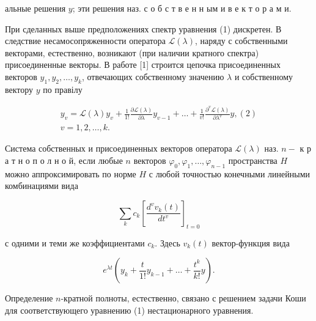 \documentclass[10pt]{article}
\begin{document}
альные решения $y$; эти решения наз. с о б с т в е н н ым и в е к т о р а м и.



При сделанных выше предположениях спектр уравнения (1) дискретен. В следствие несамосопряженности оператора $\mathscr{L}(\lambda)$, наряду с собственными векторами, естественно, возникают (при наличии кратного спектра) присоединенные векторы. В работе [1] строится цепочка присоединенных векторов $y_{1}, y_{2}, \ldots, y_{k}$, отвечающих собственному значению $\lambda$ и собственному вектору $y$ по правілу



\[

\begin{gathered}

y_{v}=\mathscr{L}(\lambda) y_{v}+\frac{1}{1 !} \frac{\partial \mathscr{L}(\lambda)}{\partial \lambda} y_{v-1}+\ldots+\frac{1}{v !} \frac{\partial^{v} \mathscr{L}(\lambda)}{\partial \lambda^{v}} y,(2) \\

v=1,2, \ldots, k .

\end{gathered}

\]



Система собственных и присоединенных векторов оператора $\mathscr{L}(\lambda)$ наз. $n-$ к р а т н о п о л н о й, если любые $n$ векторов $\varphi_{0}, \varphi_{1}, \ldots, \varphi_{n-1}$ пространства $H$ можно аппроксимировать по норме $H$ с любой точностью конечными линейными комбинациями вида



\[

\sum_{k} c_{k}\left[\frac{d^{v} v_{k}(t)}{d t^{v}}\right]_{t=0}

\]



с одними и теми же коэффициентами $c_{k}$. Здесь $v_{k}(t)$ вектор-функция вида



\[

e^{\lambda t}\left(y_{k}+\frac{t}{1 !} y_{k-1}+\ldots+\frac{t^{k}}{k !} y\right) .

\]



Определение $n$-кратной полноты, естественно, связано с решением задачи Коши для соответствующего уравнению (1) нестационарного уравнения.
\end{document}
